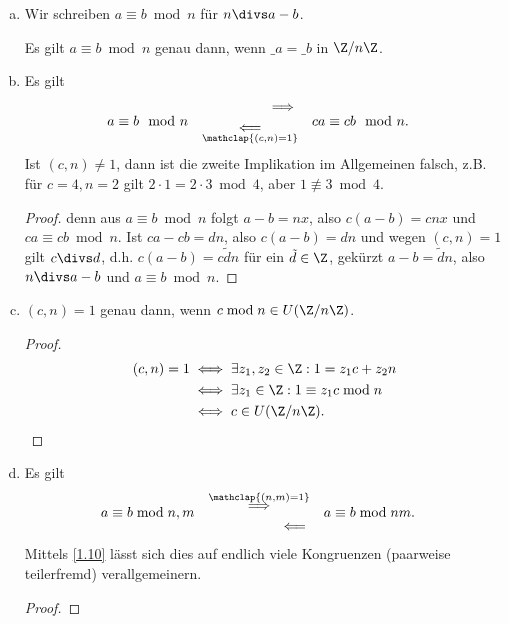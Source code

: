 \begin{nt} \label{1.12}
	\begin{enumerate}[a)]
		\item
			Wir schreiben $a \equiv b \bmod n$ für $n \divs a - b$.

			Es gilt $a \equiv b \bmod n$ genau dann, wenn $\_a = \_b$ in $\Z / n\Z$.
		\item
			Es gilt
			\begin{align*}
				a &\equiv b \mod n &
				&\begin{aligned}\implies \\ \underset{\mathclap{(c, n) = 1}}{\impliedby}\end{aligned}&
				ca &\equiv cb \mod n.
			\end{align*}
			Ist $(c, n) \neq 1$, dann ist die zweite Implikation im Allgemeinen falsch, z.B. für $c = 4, n = 2$ gilt $2 \cdot 1 = 2 \cdot 3 \bmod 4$, aber $1 \not\equiv 3 \bmod 4$.
			\begin{proof}
				denn aus $a \equiv b \bmod n$ folgt $a -b = n x$, also $c(a-b) = cnx$ und $ca \equiv cb \bmod n$.
				Ist $ca - cb = dn$, also $c(a-b) = dn$ und wegen $(c,n) = 1$ gilt $c\divs d$, d.h. $c(a-b) = c \tilde d n$ für ein $\tilde d \in \Z$, gekürzt $a - b = \tilde d n$, also $n \divs a-b$ und $a \equiv b \bmod n$.
			\end{proof}
		\item
			$(c,n) = 1$ genau dann, wenn $c \bmod n \in U(\Z / n \Z)$.
			\begin{proof}
				\begin{align*}
					(c,n) = 1
					&\iff \exists z_1, z_2 \in \Z : 1 = z_1 c + z_2 n \\
					&\iff \exists z_1 \in \Z : 1 \equiv z_1 c \bmod n \\
					&\iff c \in U(\Z / n \Z).
				\end{align*}
			\end{proof}
		\item
			Es gilt
			\begin{align*}
				a &\equiv b \bmod n, m &
				&\begin{aligned}\overset{\mathclap{(n,m) = 1}}{\implies} \\ \impliedby\end{aligned}&
				a & \equiv b \bmod nm.
			\end{align*}
			Mittels \ref{1.10} lässt sich dies auf endlich viele Kongruenzen (paarweise teilerfremd) verallgemeinern.
			\begin{proof}

\end{proof}
\end{enumerate}
\end{nt}
